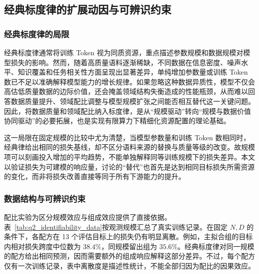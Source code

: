 \documentclass[bwprint]{gmcmthesis}
\begin{document}
\subsection{经典标度律的扩展动因与可辨识约束}

\subsubsection{经典标度律的局限}

经典标度律通常将训练 Token 视为同质资源，重点描述参数规模和数据规模对模型损失的影响。然而，随着高质量语料逐渐稀缺，不同数据在信息密度、噪声水平、知识覆盖和任务相关性方面呈现出显著差异，单纯增加参数量或训练 Token 数已不足以准确解释模型能力的增长规律。如果忽略这种数据异质性，模型不仅会高估低质量数据的边际价值，还会掩盖领域结构失衡造成的性能瓶颈，从而难以回答数据质量提升、领域配比调整与模型规模扩张之间能否相互替代这一关键问题。因此，将数据质量和领域配比纳入标度律，是从“规模驱动”转向“规模与数据价值协同驱动”的必要拓展，也是实现有限算力下精细化资源配置的理论基础。

这一局限在固定规模的比较中尤为清楚，当模型参数量和训练 Token 数相同时，经典律给出相同的损失基线，却不区分语料来源的替换与质量等级的改变。故规模项可以刻画投入增加的平均趋势，不能单独解释同等训练规模下的损失差异。本文以验证损失为可建模的响应量，讨论的“替代”也首先是达到相同目标损失所需资源的变化，而非将损失改善直接等同于所有下游能力的提升。

\subsubsection{数据结构与可辨识约束}

配比实验为区分规模效应与组成效应提供了直接依据。表~\ref{tab:q2_identifiability_data}按观测规模汇总了真实训练记录。在固定 $N,D$ 的条件下，各配方在 13 个评估目标上的损失仍有明显离散。例如，主拟合组的目标内相对损失跨度中位数为 $38.4\%$，同规模留出组为 $35.6\%$。经典标度律对同一规模的配方给出相同预测，因而需要额外的组成响应解释这部分差异。不过，每个配方仅有一次训练记录，表中离散度是描述性统计，不能全部归因为配比的因果效应。
\end{document}
